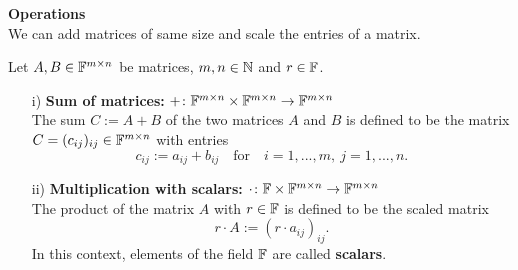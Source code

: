 \begin{frame}
 \textbf{Operations}~\\
% 
We can add  matrices of same size and scale the entries of a matrix.\\
%	
\begin{defi}\label{def:sum_scale_mats}
	Let $A,B\in{\mathbb{F}}^{m\times n}$ be matrices, $m,n \in {\mathbb{N}}$ and $r \in {\mathbb{F}}$.
	\vspace{0.2cm}
	\begin{itemize}
		\item[i)] \textbf{Sum of matrices:} $+\colon {\mathbb{F}}^{m\times n} \times {\mathbb{F}}^{m\times n} \to {\mathbb{F}}^{m\times n}$\\ \vspace{0.1cm}
		The sum $C := A + B$ of the two matrices $A$ and $B$ is defined to be the matrix $C= (c_{ij})_{ij} \in {\mathbb{F}}^{m\times n}$ with entries
		\[
		c_{ij} := a_{ij} + b_{ij}\text{~~~for~~~}i=1,...,m,~ j=1,...,n .
		\]
		\vspace{0.2cm}
		\item[ii)] \textbf{Multiplication with scalars:} $\cdot\colon {\mathbb{F}}  \times {\mathbb{F}}^{m\times n} \to {\mathbb{F}}^{m\times n}$\\ \vspace{0.1cm}
		The product of the matrix $A$ with $r\in{\mathbb{F}} $ is defined to be the scaled matrix $$r\cdot A := (r\cdot a_{ij})_{ij}.$$
		In this context, elements of the field ${\mathbb{F}} $ are called \textbf{scalars}.
	\end{itemize}
\end{defi}
\end{frame}



